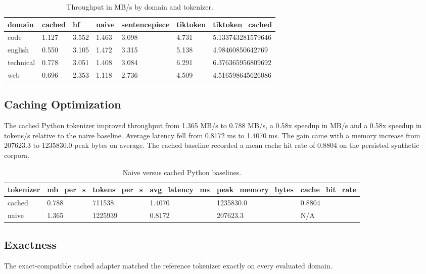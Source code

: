 \documentclass[11pt]{article}
\begin{document}
\begin{table}[H]
\centering
\begin{tabular}{lllllll}
\toprule
domain & cached & hf & naive & sentencepiece & tiktoken & tiktoken\_cached \\
\midrule
code & 1.127 & 3.552 & 1.463 & 3.098 & 4.731 & 5.133743281579646 \\
english & 0.550 & 3.105 & 1.472 & 3.315 & 5.138 & 4.98460850642769 \\
technical & 0.778 & 3.051 & 1.408 & 3.084 & 6.291 & 6.376365956809692 \\
web & 0.696 & 2.353 & 1.118 & 2.736 & 4.509 & 4.516598645626086 \\
\bottomrule
\end{tabular}
\caption{Throughput in MB/s by domain and tokenizer.}
\label{tab:domain}
\end{table}

\subsection{Caching Optimization}
The cached Python tokenizer improved throughput from 1.365 MB/s to 0.788 MB/s, a 0.58x speedup in MB/s and a 0.58x speedup in tokens/s relative to the naive baseline. Average latency fell from 0.8172 ms to 1.4070 ms. The gain came with a memory increase from 207623.3 to 1235830.0 peak bytes on average. The cached baseline recorded a mean cache hit rate of 0.8804 on the persisted synthetic corpora.

\begin{table}[H]
\centering
\begin{tabular}{llllll}
\toprule
tokenizer & mb\_per\_s & tokens\_per\_s & avg\_latency\_ms & peak\_memory\_bytes & cache\_hit\_rate \\
\midrule
cached & 0.788 & 711538 & 1.4070 & 1235830.0 & 0.8804 \\
naive & 1.365 & 1225939 & 0.8172 & 207623.3 & N/A \\
\bottomrule
\end{tabular}
\caption{Naive versus cached Python baselines.}
\label{tab:cache}
\end{table}

\subsection{Exactness}
The exact-compatible cached adapter matched the reference tokenizer exactly on every evaluated domain.
\end{document}
